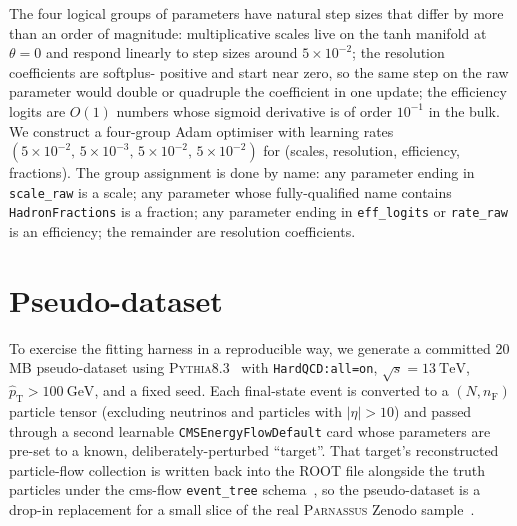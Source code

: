 \documentclass[a4paper,11pt]{article}
\begin{document}
The four logical groups of parameters have natural step sizes that
differ by more than an order of magnitude: multiplicative scales live
on the tanh manifold at $\theta=0$ and respond linearly to step sizes
around $5\times10^{-2}$; the resolution coefficients are softplus-
positive and start near zero, so the same step on the raw parameter
would double or quadruple the coefficient in one update; the
efficiency logits are $O(1)$ numbers whose sigmoid derivative is of
order $10^{-1}$ in the bulk. We construct a four-group Adam
optimiser with learning rates $(5\!\times\!10^{-2},\,5\!\times\!10^{-3},\,
5\!\times\!10^{-2},\,5\!\times\!10^{-2})$ for
(scales, resolution, efficiency, fractions). The group assignment is
done by name: any parameter ending in \texttt{scale\_raw} is a scale;
any parameter whose fully-qualified name contains
\texttt{HadronFractions} is a fraction; any parameter ending in
\texttt{eff\_logits} or \texttt{rate\_raw} is an efficiency; the
remainder are resolution coefficients.

\section{Pseudo-dataset}
\label{sec:dataset}

To exercise the fitting harness in a reproducible way, we generate a
committed 20\,MB pseudo-dataset using \textsc{Pythia8.3}~\cite{pythia8}
with \texttt{HardQCD:all=on}, $\sqrt{s}=\SI{13}{\TeV}$,
$\hat{p}_\mathrm{T}>\SI{100}{\GeV}$, and a fixed seed. Each
final-state event is converted to a $(N,n_\mathrm{F})$ particle tensor
(excluding neutrinos and particles with $|\eta|>10$) and passed through
a second learnable \texttt{CMSEnergyFlowDefault} card whose parameters
are pre-set to a known, deliberately-perturbed ``target''. That
target's reconstructed particle-flow collection is written back into
the ROOT file alongside the truth particles under the cms-flow
\texttt{event\_tree} schema~\cite{cmsflow}, so the pseudo-dataset is a
drop-in replacement for a small slice of the real \textsc{Parnassus}
Zenodo sample~\cite{parnassus_zenodo}.
\end{document}
